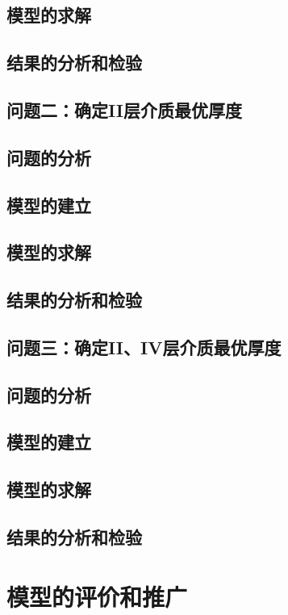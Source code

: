 \documentclass{cumcmthesis}
\begin{document}
        \subsection{模型的求解}
        \subsection{结果的分析和检验} 

    \subsection{问题二：确定II层介质最优厚度} 
        \subsection{问题的分析} 
        \subsection{模型的建立}
        \subsection{模型的求解}
        \subsection{结果的分析和检验}   

     \subsection{问题三：确定II、IV层介质最优厚度} 
        \subsection{问题的分析} 
        \subsection{模型的建立}
        \subsection{模型的求解}
        \subsection{结果的分析和检验}       

\section{模型的评价和推广}
\end{document}
